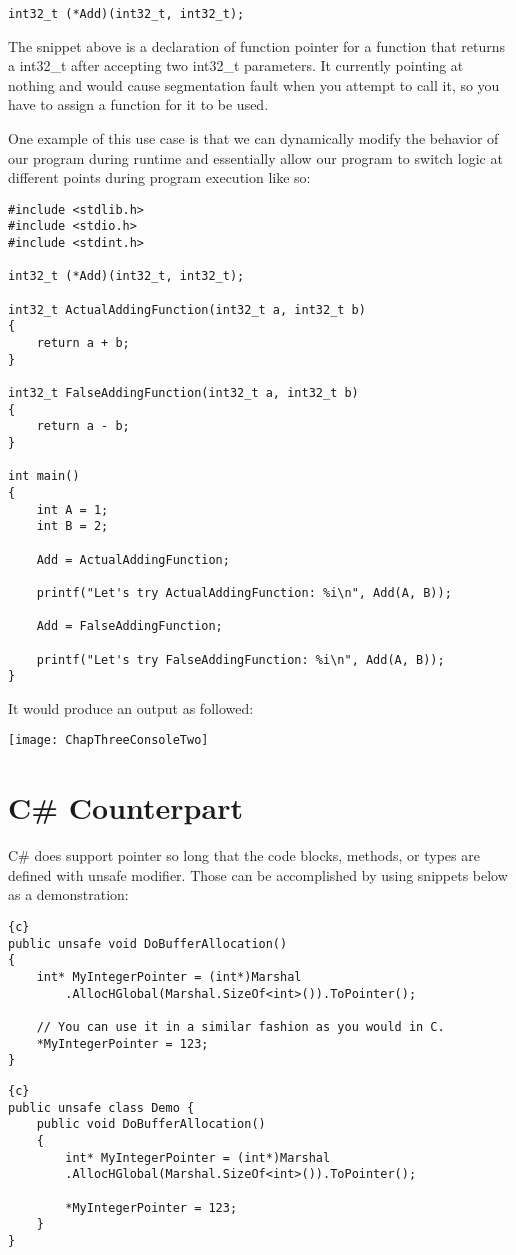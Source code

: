 \begin{lstlisting}
int32_t (*Add)(int32_t, int32_t);
\end{lstlisting}

The snippet above is a declaration of function pointer for a function that returns a int32\_t after accepting two int32\_t parameters. It currently pointing at nothing and would cause segmentation fault when you attempt to call it, so you have to assign a function for it to be used.

One example of this use case is that we can dynamically modify the behavior of our program during runtime and essentially allow our program to switch logic at different points during program execution like so:
\begin{lstlisting}
#include <stdlib.h>
#include <stdio.h>
#include <stdint.h>

int32_t (*Add)(int32_t, int32_t);

int32_t ActualAddingFunction(int32_t a, int32_t b)
{
	return a + b;
}

int32_t FalseAddingFunction(int32_t a, int32_t b)
{
	return a - b;
}

int main()
{
	int A = 1;
	int B = 2;
	
	Add = ActualAddingFunction;
	
	printf("Let's try ActualAddingFunction: %i\n", Add(A, B));
	
	Add = FalseAddingFunction;
	
	printf("Let's try FalseAddingFunction: %i\n", Add(A, B));
}
\end{lstlisting}
\newpage
It would produce an output as followed:

\texttt{[image: ChapThreeConsoleTwo]}
\newpage
\section{C\# Counterpart}
C\# does support pointer so long that the code blocks, methods, or types are defined with unsafe modifier. Those can be accomplished by using snippets below as a demonstration:
\begin{lstlisting}{c}
public unsafe void DoBufferAllocation()
{
	int* MyIntegerPointer = (int*)Marshal
		.AllocHGlobal(Marshal.SizeOf<int>()).ToPointer();
	
	// You can use it in a similar fashion as you would in C.
	*MyIntegerPointer = 123;
}
\end{lstlisting}

\begin{lstlisting}{c}
public unsafe class Demo {
	public void DoBufferAllocation()
	{
		int* MyIntegerPointer = (int*)Marshal
		.AllocHGlobal(Marshal.SizeOf<int>()).ToPointer();
		
		*MyIntegerPointer = 123;
	}
}
\end{lstlisting}

